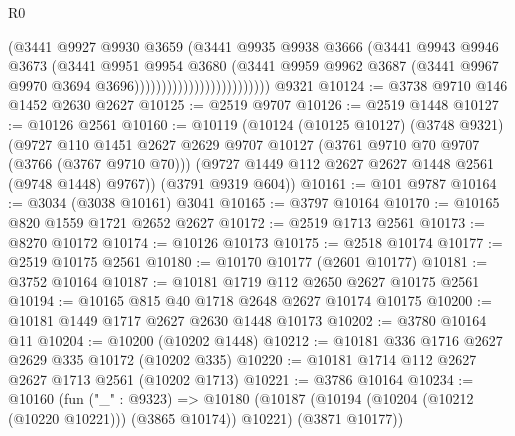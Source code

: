 \begin{lexlean}{R0}
\begin{coremodule}
                                          (@3441
                                            @9927
                                            @9930
                                            @3659
                                            (@3441
                                              @9935
                                              @9938
                                              @3666
                                              (@3441
                                                @9943
                                                @9946
                                                @3673
                                                (@3441
                                                  @9951
                                                  @9954
                                                  @3680
                                                  (@3441
                                                    @9959
                                                    @9962
                                                    @3687
                                                    (@3441
                                                      @9967
                                                      @9970
                                                      @3694
                                                      @3696)))))))))))))))))))))))))
    @9321
@10124 := @3738 @9710 @146 @1452 @2630 @2627
@10125 := @2519 @9707
@10126 := @2519 @1448
@10127 := @10126 @2561
@10160 := @10119
    (@10124
      (@10125 @10127)
      (@3748 @9321)
      (@9727
        @110
        @1451
        @2627
        @2629
        @9707
        @10127
        (@3761 @9710 @70 @9707 (@3766 (@3767 @9710 @70)))
        (@9727 @1449 @112 @2627 @2627 @1448 @2561 (@9748 @1448) @9767))
      (@3791 @9319 @604))
@10161 := @101 @9787
@10164 := @3034 (@3038 @10161) @3041
@10165 := @3797 @10164
@10170 := @10165 @820 @1559 @1721 @2652 @2627
@10172 := @2519 @1713 @2561
@10173 := @8270 @10172
@10174 := @10126 @10173
@10175 := @2518 @10174
@10177 := @2519 @10175 @2561
@10180 := @10170 @10177 (@2601 @10177)
@10181 := @3752 @10164
@10187 := @10181 @1719 @112 @2650 @2627 @10175 @2561
@10194 := @10165 @815 @40 @1718 @2648 @2627 @10174 @10175
@10200 := @10181 @1449 @1717 @2627 @2630 @1448 @10173
@10202 := @3780 @10164 @11
@10204 := @10200 (@10202 @1448)
@10212 := @10181 @336 @1716 @2627 @2629 @335 @10172 (@10202 @335)
@10220 := @10181 @1714 @112 @2627 @2627 @1713 @2561 (@10202 @1713)
@10221 := @3786 @10164
@10234 := @10160
    (fun ("_" : @9323) =>
    @10180 (@10187 (@10194 (@10204 (@10212 (@10220 @10221))) (@3865 @10174)) @10221) (@3871 @10177))

\end{coremodule}
\end{lexlean}
